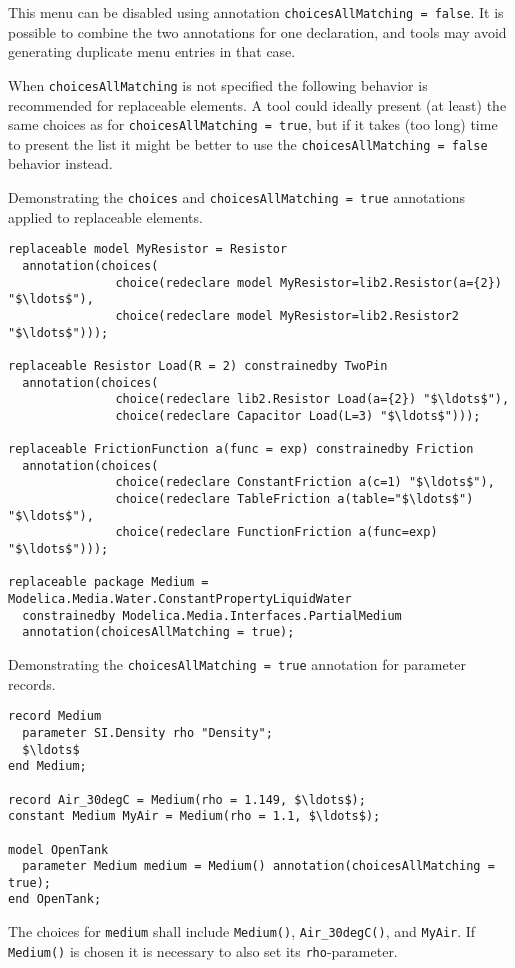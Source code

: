 This menu can be disabled using annotation \lstinline!choicesAllMatching = false!.
It is possible to combine the two annotations for one declaration, and tools may avoid generating duplicate menu entries in that case.
\begin{nonnormative}
When \lstinline!choicesAllMatching! is not specified the following behavior is recommended for replaceable elements.
A tool could ideally present (at least) the same choices as for \lstinline!choicesAllMatching = true!, but if it takes (too long) time to present the list it might be better to use the \lstinline!choicesAllMatching = false! behavior instead.
\end{nonnormative}

\begin{example}
Demonstrating the \lstinline!choices! and  \lstinline!choicesAllMatching = true! annotations applied to replaceable elements.
\begin{lstlisting}[language=modelica]
replaceable model MyResistor = Resistor
  annotation(choices(
               choice(redeclare model MyResistor=lib2.Resistor(a={2}) "$\ldots$"),
               choice(redeclare model MyResistor=lib2.Resistor2 "$\ldots$")));

replaceable Resistor Load(R = 2) constrainedby TwoPin
  annotation(choices(
               choice(redeclare lib2.Resistor Load(a={2}) "$\ldots$"),
               choice(redeclare Capacitor Load(L=3) "$\ldots$")));

replaceable FrictionFunction a(func = exp) constrainedby Friction
  annotation(choices(
               choice(redeclare ConstantFriction a(c=1) "$\ldots$"),
               choice(redeclare TableFriction a(table="$\ldots$") "$\ldots$"),
               choice(redeclare FunctionFriction a(func=exp) "$\ldots$")));

replaceable package Medium = Modelica.Media.Water.ConstantPropertyLiquidWater
  constrainedby Modelica.Media.Interfaces.PartialMedium
  annotation(choicesAllMatching = true);
\end{lstlisting}
\end{example}

\begin{example}
Demonstrating the \lstinline!choicesAllMatching = true! annotation for parameter records.
\begin{lstlisting}[language=modelica]
record Medium
  parameter SI.Density rho "Density";
  $\ldots$
end Medium;

record Air_30degC = Medium(rho = 1.149, $\ldots$);
constant Medium MyAir = Medium(rho = 1.1, $\ldots$);

model OpenTank
  parameter Medium medium = Medium() annotation(choicesAllMatching = true);
end OpenTank;
\end{lstlisting}
The choices for \lstinline!medium! shall include \lstinline!Medium()!, \lstinline!Air_30degC()!, and \lstinline!MyAir!.
If \lstinline!Medium()! is chosen it is necessary to also set its \lstinline!rho!-parameter.
\end{example}

